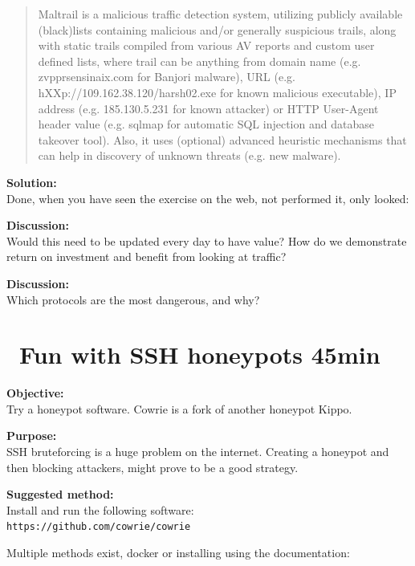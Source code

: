 \documentclass[a4paper,11pt,notitlepage]{report}
\begin{document}
\begin{quote}
  Maltrail is a malicious traffic detection system, utilizing publicly available (black)lists containing malicious and/or generally suspicious trails, along with static trails compiled from various AV reports and custom user defined lists, where trail can be anything from domain name (e.g. zvpprsensinaix.com for Banjori malware), URL (e.g. hXXp://109.162.38.120/harsh02.exe for known malicious executable), IP address (e.g. 185.130.5.231 for known attacker) or HTTP User-Agent header value (e.g. sqlmap for automatic SQL injection and database takeover tool). Also, it uses (optional) advanced heuristic mechanisms that can help in discovery of unknown threats (e.g. new malware).
\end{quote}


{\bf Solution:}\\
Done, when you have seen the exercise on the web, not performed it, only looked:

{\bf Discussion:}\\
Would this need to be updated every day to have value? How do we demonstrate return on investment and benefit from looking at traffic?



{\bf Discussion:}\\
Which protocols are the most dangerous, and why?


\chapter{\faInfoCircle\ Fun with SSH honeypots 45min}
\label{ex:ssh-honeypot}

{\bf Objective:}\\
Try a honeypot software. Cowrie is a fork of another honeypot Kippo.

{\bf Purpose:}\\
SSH bruteforcing is a huge problem on the internet. Creating a honeypot and then blocking attackers, might prove to be a good strategy.

{\bf Suggested method:}\\
Install and run the following software:\\
\verb+https://github.com/cowrie/cowrie+

Multiple methods exist, docker or installing using the documentation:\\
\end{document}
